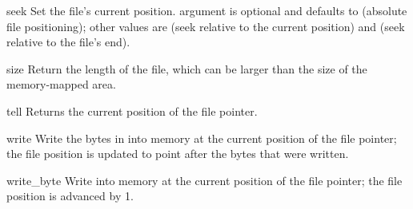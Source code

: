 \begin{methoddesc}{seek}{ }
  Set the file's current position.
   argument is optional and defaults to 
  (absolute file positioning); other values are  (seek
  relative to the current position) and  (seek relative to the
  file's end).  
\end{methoddesc}

\begin{methoddesc}{size}{}
Return the length of the file, which can be larger than the size
of the memory-mapped area. 
\end{methoddesc}

\begin{methoddesc}{tell}{}
Returns the current position of the file pointer.
\end{methoddesc}

\begin{methoddesc}{write}{}
Write the bytes in  into memory at the current position of
the file pointer; the file position is updated to point after the
bytes that were written. 
\end{methoddesc}

\begin{methoddesc}{write_byte}{}
Write  into memory at the current position of
the file pointer; the file position is advanced by 1.
\end{methoddesc}


